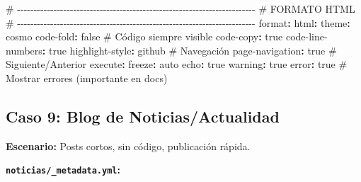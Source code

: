 \documentclass[
  doc,
  floatsintext,
  longtable,
  a4paper,
  nolmodern,
  notxfonts,
  notimes,
  12pt,
  colorlinks=true,linkcolor=blue,citecolor=blue,urlcolor=blue]{apa7}
\newenvironment{Shaded}{\begin{snugshade}}{\end{snugshade}}
\newcommand{\AttributeTok}[1]{\textcolor[rgb]{0.40,0.45,0.13}{#1}}
\newcommand{\CharTok}[1]{\textcolor[rgb]{0.13,0.47,0.30}{#1}}
\newcommand{\CommentTok}[1]{\textcolor[rgb]{0.37,0.37,0.37}{#1}}
\newcommand{\FunctionTok}[1]{\textcolor[rgb]{0.28,0.35,0.67}{#1}}
\newcommand{\KeywordTok}[1]{\textcolor[rgb]{0.00,0.23,0.31}{\textbf{#1}}}
\begin{document}
\begin{Shaded}
\begin{Highlighting}[]
\CommentTok{\# {-}{-}{-}{-}{-}{-}{-}{-}{-}{-}{-}{-}{-}{-}{-}{-}{-}{-}{-}{-}{-}{-}{-}{-}{-}{-}{-}{-}{-}{-}{-}{-}{-}{-}{-}{-}{-}{-}{-}{-}{-}{-}{-}{-}{-}{-}{-}{-}{-}{-}{-}{-}{-}{-}{-}{-}{-}{-}{-}{-}{-}{-}{-}{-}{-}{-}{-}{-}{-}{-}{-}{-}}
\CommentTok{\# FORMATO HTML}
\CommentTok{\# {-}{-}{-}{-}{-}{-}{-}{-}{-}{-}{-}{-}{-}{-}{-}{-}{-}{-}{-}{-}{-}{-}{-}{-}{-}{-}{-}{-}{-}{-}{-}{-}{-}{-}{-}{-}{-}{-}{-}{-}{-}{-}{-}{-}{-}{-}{-}{-}{-}{-}{-}{-}{-}{-}{-}{-}{-}{-}{-}{-}{-}{-}{-}{-}{-}{-}{-}{-}{-}{-}{-}{-}}
\FunctionTok{format}\KeywordTok{:}
\AttributeTok{  }\FunctionTok{html}\KeywordTok{:}
\AttributeTok{    }\FunctionTok{theme}\KeywordTok{:}\AttributeTok{ cosmo}
\AttributeTok{    }\FunctionTok{code{-}fold}\KeywordTok{:}\AttributeTok{ }\CharTok{false}\CommentTok{        \# Código siempre visible}
\AttributeTok{    }\FunctionTok{code{-}copy}\KeywordTok{:}\AttributeTok{ }\CharTok{true}
\AttributeTok{    }\FunctionTok{code{-}line{-}numbers}\KeywordTok{:}\AttributeTok{ }\CharTok{true}
\AttributeTok{    }\FunctionTok{highlight{-}style}\KeywordTok{:}\AttributeTok{ github}
\AttributeTok{    }
\CommentTok{    \# Navegación}
\AttributeTok{    }\FunctionTok{page{-}navigation}\KeywordTok{:}\AttributeTok{ }\CharTok{true}\CommentTok{   \# Siguiente/Anterior}
\AttributeTok{    }
\FunctionTok{execute}\KeywordTok{:}
\AttributeTok{  }\FunctionTok{freeze}\KeywordTok{:}\AttributeTok{ auto}
\AttributeTok{  }\FunctionTok{echo}\KeywordTok{:}\AttributeTok{ }\CharTok{true}
\AttributeTok{  }\FunctionTok{warning}\KeywordTok{:}\AttributeTok{ }\CharTok{true}
\AttributeTok{  }\FunctionTok{error}\KeywordTok{:}\AttributeTok{ }\CharTok{true}\CommentTok{               \# Mostrar errores (importante en docs)}
\end{Highlighting}
\end{Shaded}

\subsection{Caso 9: Blog de
Noticias/Actualidad}\label{caso-9-blog-de-noticiasactualidad}

\textbf{Escenario:} Posts cortos, sin código, publicación rápida.

\textbf{\texttt{noticias/\_metadata.yml}:}
\end{document}
